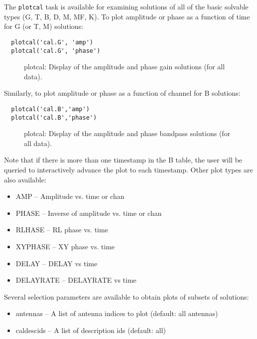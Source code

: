 The {\tt plotcal} task is available for examining solutions of all of
the basic solvable types (G, T, B, D, M, MF, K).  To plot amplitude or
phase as a function of time for G (or T, M) solutions:

\small
\begin{verbatim}
  plotcal('cal.G', 'amp')
  plotcal('cal.G', 'phase')
\end{verbatim}
\normalsize

\begin{figure}[h!]
\caption{\label{fig:plotcal_Gall} plotcal: Display of the amplitude and
  phase gain solutions (for all data).} 
\hrulefill
\end{figure}

Similarly, to plot amplitude or phase as a function of channel for B
solutions:

\small
\begin{verbatim}
  plotcal('cal.B','amp')
  plotcal('cal.B','phase')
\end{verbatim}
\normalsize

\begin{figure}[h!]
\caption{\label{fig:plotcal_B} plotcal: Display of the amplitude and
  phase bandpass solutions (for all data).} 
\hrulefill
\end{figure}

Note that if there is more than one timestamp in the B table, the user
will be queried to interactively advance the plot to each timestamp.
Other plot types are also available:

\begin{itemize}
   \item AMP -- Amplitude vs. time or chan
   \item PHASE -- Inverse of amplitude vs. time or chan
   \item RLHASE -- RL phase vs. time
   \item XYPHASE -- XY phase vs. time
   \item DELAY -- DELAY vs time
   \item DELAYRATE -- DELAYRATE vs time
\end{itemize}

Several selection parameters are available to obtain plots of subsets of
solutions:

\begin{itemize}
   \item antennas -- A list of antenna indices to plot (default: all
      antennas)
   \item caldescids -- A list of description ids (default: all)
\end{itemize}



